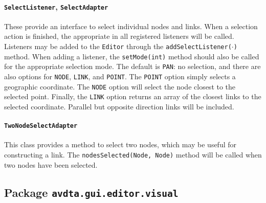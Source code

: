 \paragraph*{\texttt{SelectListener}, \texttt{SelectAdapter}}
These provide an interface to select individual nodes and links. When a selection action is finished, the appropriate in all registered listeners will be called. Listeners may be added to the \texttt{Editor} through the \texttt{addSelectListener($\cdot$)} method. When adding a listener, the \texttt{setMode(int)} method should also be called for the appropriate selection mode. The default is \texttt{PAN}: no selection, and there are also options for \texttt{NODE}, \texttt{LINK}, and \texttt{POINT}. The \texttt{POINT} option simply selects a geographic coordinate. The \texttt{NODE} option will select the node closest to the selected point. Finally, the \texttt{LINK} option returns an array of the closest links to the selected coordinate. Parallel but opposite direction links will be included.

\paragraph*{\texttt{TwoNodeSelectAdapter}}
This class provides a method to select two nodes, which may be useful for constructing a link. The \texttt{nodesSelected(Node, Node)} method will be called when two nodes have been selected.



\subsection{Package \texttt{avdta.gui.editor.visual}}
\label{api:editor:visual}


